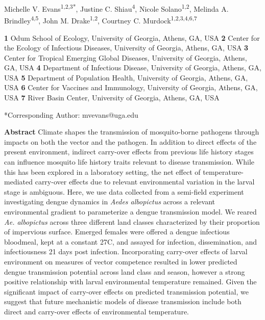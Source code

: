 \documentclass[12pt]{article}
\begin{document}
\setlength\parindent{0pt}%

{\Large
\textbf{}}

\bigskip

Michelle V. Evans\textsuperscript{1,2,3*},
Justine C. Shiau\textsuperscript{4},
Nicole Solano\textsuperscript{1,2},
Melinda A. Brindley\textsuperscript{4,5},
John M. Drake\textsuperscript{1,2},
Courtney C. Murdock\textsuperscript{1,2,3,4,6,7}
\smallskip


\textbf{1} Odum School of Ecology, University of Georgia, Athens, GA, USA
\newline
\textbf{2} Center for the Ecology of Infectious Diseases, University of Georgia, Athens, GA, USA
\newline
\textbf{3} Center for Tropical Emerging Global Diseases, University of Georgia, Athens, GA, USA
\newline
\textbf{4} Department of Infectious Disease, University of Georgia, Athens, GA, USA
\newline
\textbf{5} Department of Population Health, University of Georgia, Athens, GA, USA
\newline
\textbf{6} Center for Vaccines and Immunology, University of Georgia, Athens, GA, USA
\newline
\textbf{7} River Basin Center, University of Georgia, Athens, GA, USA
\smallskip

\noindent
*Corresponding Author: mvevans@uga.edu
\bigskip

\newpage

\textbf{Abstract} Climate shapes the transmission of mosquito-borne pathogens through impacts on both the vector and the pathogen.  In addition to direct effects of the present environment, indirect carry-over effects from previous life history stages can influence mosquito life history traits relevant to disease transmission. While this has been explored in a laboratory setting, the net effect of temperature-mediated carry-over effects due to relevant environmental variation in the larval stage is ambiguous. Here, we use data collected from a semi-field experiment investigating dengue dynamics in \textit{Aedes albopictus} across a relevant environmental gradient to parameterize a dengue transmission model. We reared \textit{Ae. albopictus} across three different land classes characterized by their proportion of impervious surface. Emerged females were offered a dengue infectious bloodmeal, kept at a constant 27C, and assayed for infection, dissemination, and infectiousness 21 days post infection. Incorporating carry-over effects of larval environment on measures of vector competence resulted in lower predicted dengue transmission potential across land class and season, however a strong positive relationship with larval environmental temperature remained. Given the significant impact of carry-over effects on predicted transmission potential, we suggest that future mechanistic models of disease transmission include both direct and carry-over effects of environmental temperature.
\end{document}
